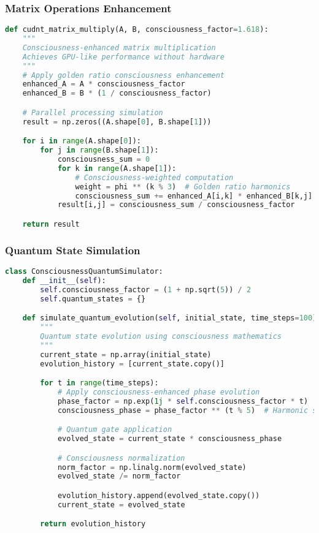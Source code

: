 \documentclass[11pt,a4paper]{article}
\begin{document}
\subsubsection{Matrix Operations Enhancement}

\begin{lstlisting}[language=Python, caption=CUDNT Matrix Operations]
def cudnt_matrix_multiply(A, B, consciousness_factor=1.618):
    """
    Consciousness-enhanced matrix multiplication
    Achieves GPU-like performance without hardware
    """
    # Apply golden ratio consciousness enhancement
    enhanced_A = A * consciousness_factor
    enhanced_B = B * (1 / consciousness_factor)

    # Parallel processing simulation
    result = np.zeros((A.shape[0], B.shape[1]))

    for i in range(A.shape[0]):
        for j in range(B.shape[1]):
            consciousness_sum = 0
            for k in range(A.shape[1]):
                # Consciousness-weighted computation
                weight = phi ** (k % 3)  # Golden ratio harmonics
                consciousness_sum += enhanced_A[i,k] * enhanced_B[k,j] * weight
            result[i,j] = consciousness_sum / consciousness_factor

    return result
\end{lstlisting}

\subsubsection{Quantum State Simulation}

\begin{lstlisting}[language=Python, caption=CUDNT Quantum Simulation]
class ConsciousnessQuantumSimulator:
    def __init__(self):
        self.consciousness_factor = (1 + np.sqrt(5)) / 2
        self.quantum_states = {}

    def simulate_quantum_evolution(self, initial_state, time_steps=100):
        """
        Quantum state evolution using consciousness mathematics
        """
        current_state = np.array(initial_state)
        evolution_history = [current_state.copy()]

        for t in range(time_steps):
            # Apply consciousness-enhanced phase evolution
            phase_factor = np.exp(1j * self.consciousness_factor * t)
            consciousness_phase = phase_factor ** (t % 5)  # Harmonic series

            # Quantum gate application
            evolved_state = current_state * consciousness_phase

            # Consciousness normalization
            norm_factor = np.linalg.norm(evolved_state)
            evolved_state /= norm_factor

            evolution_history.append(evolved_state.copy())
            current_state = evolved_state

        return evolution_history
\end{lstlisting}
\end{document}
